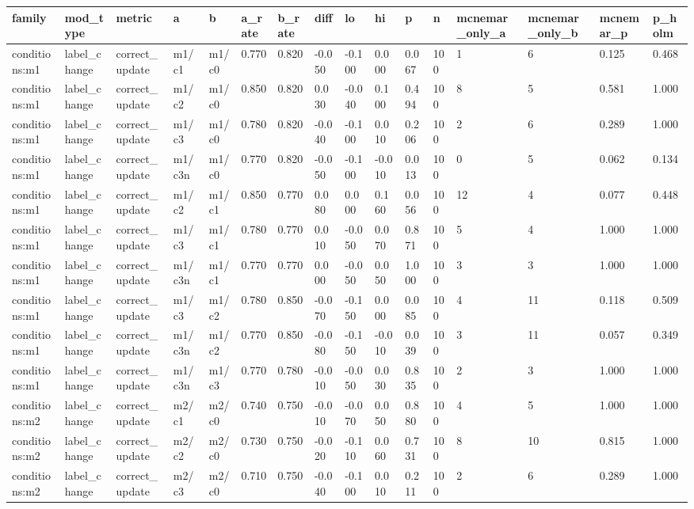 \begin{tabular}{llllllllllllllll}
\toprule
family & mod\_type & metric & a & b & a\_rate & b\_rate & diff & lo & hi & p & n & mcnemar\_only\_a & mcnemar\_only\_b & mcnemar\_p & p\_holm \\
\midrule
conditions:m1 & label\_change & correct\_update & m1/c1 & m1/c0 & 0.770 & 0.820 & -0.050 & -0.100 & 0.000 & 0.067 & 100 & 1 & 6 & 0.125 & 0.468 \\
conditions:m1 & label\_change & correct\_update & m1/c2 & m1/c0 & 0.850 & 0.820 & 0.030 & -0.040 & 0.100 & 0.494 & 100 & 8 & 5 & 0.581 & 1.000 \\
conditions:m1 & label\_change & correct\_update & m1/c3 & m1/c0 & 0.780 & 0.820 & -0.040 & -0.100 & 0.010 & 0.206 & 100 & 2 & 6 & 0.289 & 1.000 \\
conditions:m1 & label\_change & correct\_update & m1/c3n & m1/c0 & 0.770 & 0.820 & -0.050 & -0.100 & -0.010 & 0.013 & 100 & 0 & 5 & 0.062 & 0.134 \\
conditions:m1 & label\_change & correct\_update & m1/c2 & m1/c1 & 0.850 & 0.770 & 0.080 & 0.000 & 0.160 & 0.056 & 100 & 12 & 4 & 0.077 & 0.448 \\
conditions:m1 & label\_change & correct\_update & m1/c3 & m1/c1 & 0.780 & 0.770 & 0.010 & -0.050 & 0.070 & 0.871 & 100 & 5 & 4 & 1.000 & 1.000 \\
conditions:m1 & label\_change & correct\_update & m1/c3n & m1/c1 & 0.770 & 0.770 & 0.000 & -0.050 & 0.050 & 1.000 & 100 & 3 & 3 & 1.000 & 1.000 \\
conditions:m1 & label\_change & correct\_update & m1/c3 & m1/c2 & 0.780 & 0.850 & -0.070 & -0.150 & 0.000 & 0.085 & 100 & 4 & 11 & 0.118 & 0.509 \\
conditions:m1 & label\_change & correct\_update & m1/c3n & m1/c2 & 0.770 & 0.850 & -0.080 & -0.150 & -0.010 & 0.039 & 100 & 3 & 11 & 0.057 & 0.349 \\
conditions:m1 & label\_change & correct\_update & m1/c3n & m1/c3 & 0.770 & 0.780 & -0.010 & -0.050 & 0.030 & 0.835 & 100 & 2 & 3 & 1.000 & 1.000 \\
conditions:m2 & label\_change & correct\_update & m2/c1 & m2/c0 & 0.740 & 0.750 & -0.010 & -0.070 & 0.050 & 0.880 & 100 & 4 & 5 & 1.000 & 1.000 \\
conditions:m2 & label\_change & correct\_update & m2/c2 & m2/c0 & 0.730 & 0.750 & -0.020 & -0.110 & 0.060 & 0.731 & 100 & 8 & 10 & 0.815 & 1.000 \\
conditions:m2 & label\_change & correct\_update & m2/c3 & m2/c0 & 0.710 & 0.750 & -0.040 & -0.100 & 0.010 & 0.211 & 100 & 2 & 6 & 0.289 & 1.000 \\

\end{tabular}
